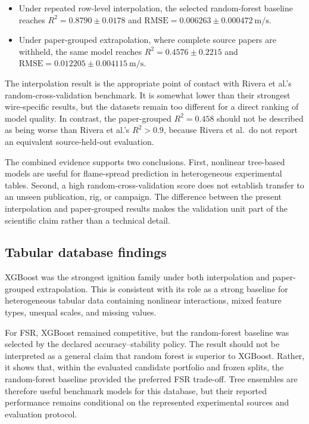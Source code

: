 \begin{itemize}
  \item Under repeated row-level interpolation, the selected random-forest
  baseline reaches \(R^2=0.8790\pm0.0178\) and
  \(\mathrm{RMSE}=0.006263\pm0.000472~
  \si{\metre\per\second}\).

  \item Under paper-grouped extrapolation, where complete source papers are
  withheld, the same model reaches \(R^2=0.4576\pm0.2215\) and
  \(\mathrm{RMSE}=0.012205\pm0.004115~
  \si{\metre\per\second}\).
\end{itemize}

The interpolation result is the appropriate point of contact with
Rivera et al.'s random-cross-validation benchmark. It is somewhat lower than
their strongest wire-specific results, but the datasets remain too different
for a direct ranking of model quality. In contrast, the paper-grouped
\(R^2=0.458\) should not be described as being worse than Rivera et al.'s
\(R^2>0.9\), because Rivera et al.\ do not report an equivalent
source-held-out evaluation.

The combined evidence supports two conclusions. First, nonlinear tree-based
models are useful for flame-spread prediction in heterogeneous experimental
tables. Second, a high random-cross-validation score does not establish
transfer to an unseen publication, rig, or campaign. The difference between
the present interpolation and paper-grouped results makes the validation unit
part of the scientific claim rather than a technical detail.

\subsection{Tabular database findings}

XGBoost was the strongest ignition family under both interpolation and
paper-grouped extrapolation. This is consistent with its role as a strong
baseline for heterogeneous tabular data containing nonlinear interactions,
mixed feature types, unequal scales, and missing values.

For FSR, XGBoost remained competitive, but the random-forest baseline was
selected by the declared accuracy--stability policy. The result should not be
interpreted as a general claim that random forest is superior to XGBoost.
Rather, it shows that, within the evaluated candidate portfolio and frozen
splits, the random-forest baseline provided the preferred FSR trade-off.
Tree ensembles are therefore useful benchmark models for this database, but
their reported performance remains conditional on the represented experimental
sources and evaluation protocol.

